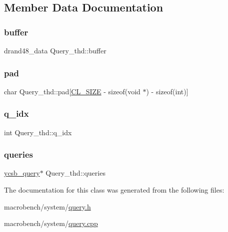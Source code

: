 \subsection{Member Data Documentation}
\mbox{\label{classQuery__thd_ae2b0aa6a30790eac1b2b24929e91e040}} 
\subsubsection{\texorpdfstring{buffer}{buffer}}
{\footnotesize\ttfamily drand48\+\_\+data Query\+\_\+thd\+::buffer}

\mbox{\label{classQuery__thd_a17426d37b988c4d8c033974447620b81}} 
\subsubsection{\texorpdfstring{pad}{pad}}
{\footnotesize\ttfamily char Query\+\_\+thd\+::pad\mbox{[}\hyperlink{config_8h_aa18ff96566bf8c1f4cd38c1e7bc4ca80}{C\+L\+\_\+\+S\+I\+ZE} -\/ sizeof(void $\ast$) -\/ sizeof(int)\mbox{]}}

\mbox{\label{classQuery__thd_a3f2ad0326aca9475a6214fb39c6fc745}} 
\subsubsection{\texorpdfstring{q\+\_\+idx}{q\_idx}}
{\footnotesize\ttfamily int Query\+\_\+thd\+::q\+\_\+idx}

\mbox{\label{classQuery__thd_ab420c47c42ec689a5a38022380a01b60}} 
\subsubsection{\texorpdfstring{queries}{queries}}
{\footnotesize\ttfamily \hyperlink{classycsb__query}{ycsb\+\_\+query}$\ast$ Query\+\_\+thd\+::queries}



The documentation for this class was generated from the following files\+:\begin{DoxyCompactItemize}
\item 
macrobench/system/\hyperlink{query_8h}{query.\+h}\item 
macrobench/system/\hyperlink{query_8cpp}{query.\+cpp}\end{DoxyCompactItemize}
